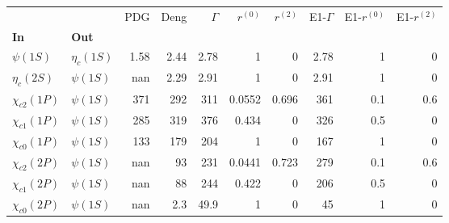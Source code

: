\begin{tabular}{l|l|r|r|r|r|r|r|r|r}
\toprule
                &            &  PDG &  Deng &  $\Gamma$ &  $r^{(0)}$ &  $r^{(2)}$ &  E1-$\Gamma$ &  E1-$r^{(0)}$ &  E1-$r^{(2)}$ \\
\textbf{In} & \textbf{Out} &      &       &           &            &            &              &               &               \\
\midrule
\textbf{$\psi(1S)$} & \textbf{$\eta_{c}(1S)$} & 1.58 &  2.44 &      2.78 &          1 &          0 &         2.78 &             1 &             0 \\
\textbf{$\eta_{c}(2S)$} & \textbf{$\psi(1S)$} &  nan &  2.29 &      2.91 &          1 &          0 &         2.91 &             1 &             0 \\
\textbf{$\chi_{c2}(1P)$} & \textbf{$\psi(1S)$} &  371 &   292 &       311 &     0.0552 &      0.696 &          361 &           0.1 &           0.6 \\
\textbf{$\chi_{c1}(1P)$} & \textbf{$\psi(1S)$} &  285 &   319 &       376 &      0.434 &          0 &          326 &           0.5 &             0 \\
\textbf{$\chi_{c0}(1P)$} & \textbf{$\psi(1S)$} &  133 &   179 &       204 &          1 &          0 &          167 &             1 &             0 \\
\textbf{$\chi_{c2}(2P)$} & \textbf{$\psi(1S)$} &  nan &    93 &       231 &     0.0441 &      0.723 &          279 &           0.1 &           0.6 \\
\textbf{$\chi_{c1}(2P)$} & \textbf{$\psi(1S)$} &  nan &    88 &       244 &      0.422 &          0 &          206 &           0.5 &             0 \\
\textbf{$\chi_{c0}(2P)$} & \textbf{$\psi(1S)$} &  nan &   2.3 &      49.9 &          1 &          0 &           45 &             1 &             0 \\
\bottomrule
\end{tabular}
